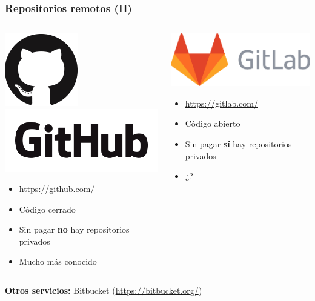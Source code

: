 \documentclass{beamer}
\begin{document}
\begin{frame}\frametitle{Repositorios remotos (II)}
	\begin{columns}
		\begin{column}{0.5\textwidth}
			\begin{center}
				\includegraphics[height = 1.3 cm]{fig/github/GitHub-Mark-120px-plus.png}
				\includegraphics[height = 1.3 cm]{fig/github/GitHub_Logo.png}
			\end{center}
			\begin{itemize}
				\item \url{https://github.com/}
				\item Código cerrado
				\item Sin pagar \textbf{no} hay repositorios privados
				\item Mucho más conocido
			\end{itemize}
		\end{column}
		\begin{column}{0.5\textwidth}
			\begin{center}
				\includegraphics[height = 1.3 cm]{fig/gitlab_wm_no_bg.pdf}
			\end{center}
			\begin{itemize}
				\item \url{https://gitlab.com/}
				\item Código abierto
				\item Sin pagar \textbf{sí} hay repositorios privados
				\item ¿?
			\end{itemize}
		\end{column}
	\end{columns}

\vspace{0.5cm}

\textbf{Otros servicios:} Bitbucket (\url{https://bitbucket.org/})

\end{frame}
\end{document}
